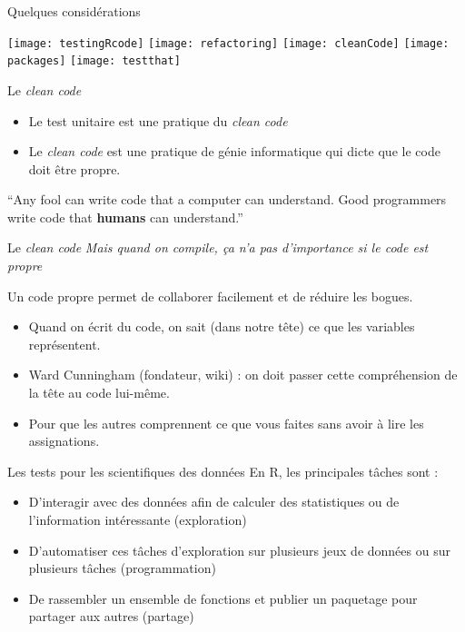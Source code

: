 \documentclass[11pt]{beamer}
\begin{document}
\begin{frame}{Quelques considérations}

\texttt{[image: testingRcode]} \hfill
\texttt{[image: refactoring]} \hfill
\texttt{[image: cleanCode]} \hfill
\texttt{[image: packages]} \hfill
\texttt{[image: testthat]}

\end{frame}

\begin{frame}{Le \textit{clean code}}
\begin{itemize}
    \item Le test unitaire est une pratique du \textit{clean code}
    \item Le \textit{clean code} est une pratique de génie informatique qui dicte que le code doit être propre.
\end{itemize}
\begin{block}{}
{\large ``Any fool can write code that a computer can understand. Good programmers
write code that \textbf{humans} can understand.''}
\vskip5mm
\hspace*{}
\end{block}
\end{frame}

\begin{frame}{Le \textit{clean code}}
\textit{Mais quand on compile, ça n'a pas d'importance si le code est propre}

Un code propre permet de collaborer facilement et de réduire les bogues.
\begin{itemize}
    \item Quand on écrit du code, on sait (dans notre tête) ce que les variables représentent.
    \item Ward Cunningham (fondateur, wiki) : on doit passer cette compréhension de la tête au code lui-même.
    \item Pour que les autres comprennent ce que vous faites sans avoir à lire les assignations.
\end{itemize}
\end{frame}

\begin{frame}{Les tests pour les scientifiques des données}
En \textsf{R}, les principales tâches sont :
\begin{itemize}
\item D'interagir avec des données afin de calculer des statistiques ou de l'information intéressante (exploration)
\item D'automatiser ces tâches d'exploration sur plusieurs jeux de données ou sur plusieurs tâches (programmation)
\item De rassembler un ensemble de fonctions et publier un paquetage pour partager aux autres (partage)
\end{itemize}
\end{frame}
\end{document}
